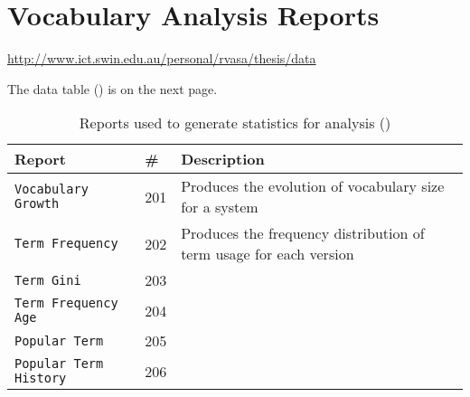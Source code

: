 
\chapter{Vocabulary Analysis Reports} %
\label{cha:vocabulary_analysis_reports}

\vspace{-0.5cm}

\url{http://www.ict.swin.edu.au/personal/rvasa/thesis/data}

The data table () is on the next page.

\begin{table}[t]
\vspace{-3.0cm}
\centering
\begin{tabular}{|p{}|l|p{}|}
\hline
{\bf Report} & {\bf \#} & {\bf Description} \\
\hline \hline 
\texttt{Vocabulary Growth} & 201 & Produces the evolution of vocabulary size for a system \\
\hline
\texttt{Term Frequency} & 202 & Produces the frequency distribution of term usage for each version \\
\hline
\texttt{Term Gini} & 203 &  \\
\hline
\texttt{Term Frequency Age} & 204 &  \\
\hline
\texttt{Popular Term} & 205 &  \\
\hline
\texttt{Popular Term History} & 206 &  \\
\hline

\end{tabular}
\caption{Reports used to generate statistics for analysis ()}
\label{tab:change_files}
\end{table}


